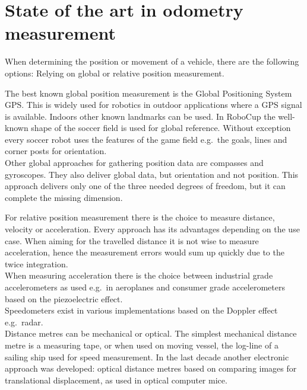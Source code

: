 \documentclass[12pt,a4paper]{article}
\begin{document}
\clearpage
\section{State of the art in odometry measurement}

When determining the position or movement of a vehicle, there are the following options: 
Relying on global or relative position measurement.

The best known global position measurement is the Global Positioning System GPS.
This is widely used for robotics in outdoor applications where a GPS signal is available.
Indoors other known landmarks can be used.
In RoboCup the well-known shape of the soccer field is used for global reference.
Without exception every soccer robot uses the features of the game field e.g.\ the goals, lines and corner posts for orientation.\\
Other global approaches for gathering position data are compasses and gyroscopes.
They also deliver global data, but orientation and not position. 
This approach delivers only one of the three needed degrees of freedom, but it can complete the missing dimension.


For relative position measurement there is the choice to measure distance, velocity or acceleration.
Every approach has its advantages depending on the use case.
When aiming for the travelled distance it is not wise to measure acceleration, hence the measurement errors would sum up quickly due to the twice integration.\\
When measuring acceleration there is the choice between industrial grade accelerometers as used e.g.\ in aeroplanes and consumer grade accelerometers based on the piezoelectric effect.\\
Speedometers exist in various implementations based on the Doppler effect e.g.\ radar.\\
Distance metres can be mechanical or optical.
The simplest mechanical distance metre is a measuring tape, or when used on moving vessel, the log-line of a sailing ship used for speed measurement.
In the last decade another electronic approach was developed: optical distance metres based on comparing images for translational displacement, as used in optical computer mice.

\end{document}
